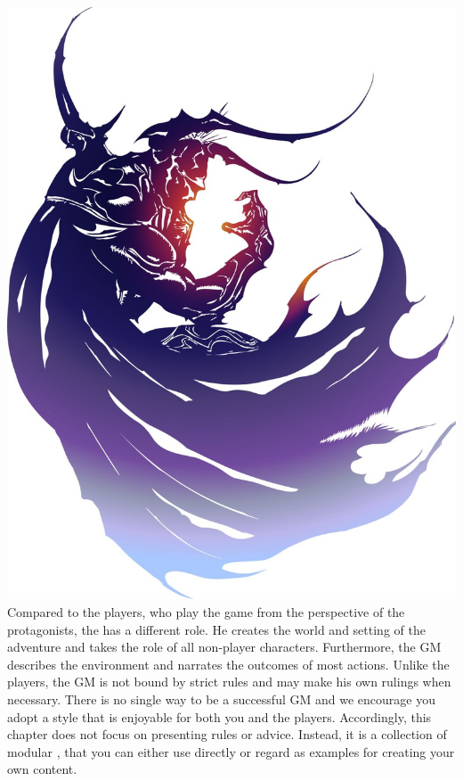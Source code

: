 %
\\\\
%
\includegraphics[width=\columnwidth]{./art/images/ff4.jpg}
%
\vfill
%
Compared to the players, who play the game from the perspective of the protagonists, the  has a different role.
He creates the world and setting of the adventure and takes the role of all non-player characters.
Furthermore, the GM describes the environment and narrates the outcomes of most actions. 
Unlike the players, the GM is not bound by strict rules and may make his own rulings when necessary.
There is no single way to be a successful GM and we encourage you adopt a style that is enjoyable for both you and the players.
%
\vfill
%
Accordingly, this chapter does not focus on presenting rules or advice.
Instead, it is a collection of modular , that you can either use directly or regard as examples for creating your own content.
